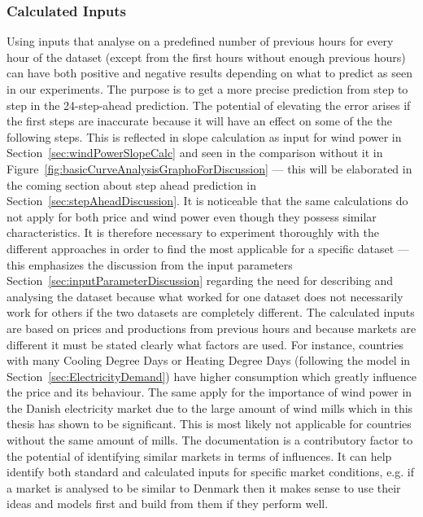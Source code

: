 \subsubsection{Calculated Inputs}
Using inputs that analyse on a predefined number of previous hours for every hour of the dataset (except from the first hours without enough previous hours) can have both positive and negative results depending on what to predict as seen in our experiments. The purpose is to get a more precise prediction from step to step in the 24-step-ahead prediction. The potential of elevating the error arises if the first steps are inaccurate because it will have an effect on some of the the following steps. This is reflected in slope calculation as input for wind power in Section~\ref{sec:windPowerSlopeCalc} and seen in the comparison without it in Figure~\ref{fig:basicCurveAnalysisGraphoForDiscussion} --- this will be elaborated in the coming section about step ahead prediction in Section~\ref{sec:stepAheadDiscussion}. It is noticeable that the same calculations do not apply for both price and wind power even though they possess similar characteristics. It is therefore necessary to experiment thoroughly with the different approaches in order to find the most applicable for a specific dataset --- this emphasizes the discussion from the input parameters Section~\ref{sec:inputParameterDiscussion} regarding the need for describing and analysing the dataset because what worked for one dataset does not necessarily work for others if the two datasets are completely different. The calculated inputs are based on prices and productions from previous hours and because markets are different it must be stated clearly what factors are used. For instance, countries with many Cooling Degree Days or Heating Degree Days (following the model in Section~\ref{sec:ElectricityDemand}) have higher consumption which greatly influence the price and its behaviour. The same apply for the importance of wind power in the Danish electricity market due to the large amount of wind mills which in this thesis has shown to be significant. This is most likely not applicable for countries without the same amount of mills. The documentation is a contributory factor to the potential of identifying similar markets in terms of influences. It can help identify both standard and calculated inputs for specific market conditions, e.g. if a market is analysed to be similar to Denmark then it makes sense to use their ideas and models first and build from them if they perform well.

